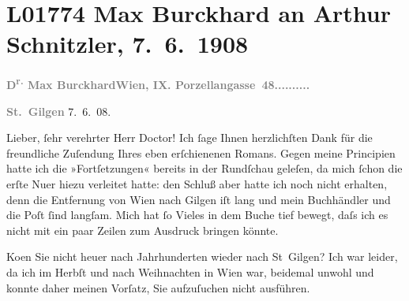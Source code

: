 

\section[Max Burckhard an Arthur Schnitzler, 7. 6. 1908]{L01774 Max Burckhard an Arthur Schnitzler, 7. 6. 1908}
\nopagebreak{}
\rehead{ }\normalsize\beginnumbering{}
\toendnotes[C]{\smallbreak\pagebreak[2]}
\toendnotes[C]{\smallbreak}
\pstart
           {\pb}\textcolor{gray}{\textbf{D\textsuperscript{r.} Max Burckhard}}\hfill \textcolor{gray}{\textbf{Wien, IX. Porzellangasse 48..........}}\pend
           
\pstart
           \raggedleft{}\textcolor{gray}{\textbf{St. Gilgen}}{ }7. 6. 08.\pend
           
\pstart{}Lieber, ſehr verehrter Herr Doctor!\pend\vspace{0.5em}
\pstart
           Ich ſage Ihnen herzlichſten Dank für die freundliche Zuſendung Ihres eben
               erſchienenen Romans. Gegen
               meine Principien hatte ich die »Fortſetzungen« bereits in der Rundſchau geleſen, da mich ſchon die erſte Nu{\geminationm}er hiezu verleitet hatte: den Schluß aber hatte ich
               noch nicht erhalten, denn die Entfernung von Wien
               nach Gilgen iſt lang und mein Buchhändler und die
               Poſt ſind langſam. Mich hat ſo Vieles in dem Buche tief bewegt, daſs ich es nicht mit ein paar Zeilen
               zum Ausdruck bringen könnte.\pend
           
\pstart
           Ko{\geminationm}en Sie nicht heuer nach Jahrhunderten wieder nach St Gilgen? Ich war leider, da ich im Herbſt und
               nach Weihnachten in Wien war, beidemal unwohl und
               konnte daher meinen Vorſatz, Sie aufzuſuchen nicht ausführen.\pend
           
